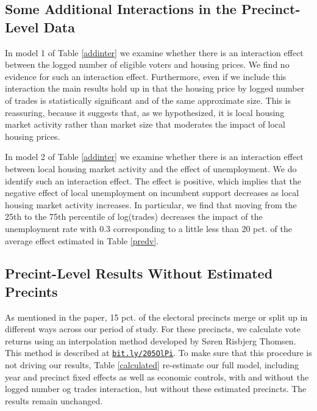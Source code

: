 \documentclass[12pt,a4paper]{article}
\begin{document}
	\newpage
	
	\subsection{Some Additional Interactions in the Precinct-Level Data} \label{add_interaction}
	\setcounter{table}{0}
	\setcounter{figure}{0}
	
	In model 1 of Table \ref{addinter} we examine whether there is an interaction effect between the logged number of eligible voters and housing prices. We find no evidence for such an interaction effect. Furthermore, even if we include this interaction the main results hold up in that the housing price by logged number of trades is statistically significant and of the same approximate size. This is reassuring, because it suggests that, as we hypothesized, it is local housing market activity rather than market size that moderates the impact of local housing prices.
	
	In model 2 of Table \ref{addinter} we examine whether there is an interaction effect between local housing market activity and the effect of unemployment. We do identify such an interaction effect. The effect is positive, which implies that the negative effect of local unemployment on incumbent support decreases as local housing market activity increases. In particular, we find that moving from the 25th to the 75th percentile of log(trades) decreases the impact of the unemployment rate with 0.3 corresponding to a little less than 20 pct. of the average effect estimated in Table \ref{predv}.
	
	
	\newpage
	
	\subsection{Precint-Level Results Without Estimated Precints} \label{calc}
	\setcounter{table}{0}
	\setcounter{figure}{0}
	
	As mentioned in the paper, 15 pct. of the electoral precincts merge or split up in different ways  across our period of study. For these precincts, we calculate vote returns using an interpolation method developed by Søren Risbjerg Thomsen. This method is described at \texttt{\href{http://bit.ly/205OlPi}{bit.ly/205OlPi}}. To make sure that this procedure is not driving our results, Table \ref{calculated} re-estimate our full model, including year and precinct fixed effects as well as economic controls, with and without the logged number og trades interaction, but without these estimated precincts. The results remain unchanged.  
	
\end{document}
